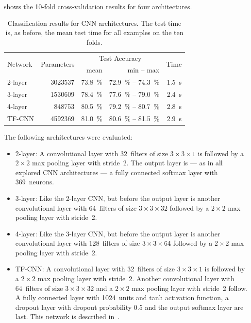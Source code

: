  shows the 10-fold cross-validation results for four
architectures.
\begin{table}[H]
    \centering
    \begin{tabular}{lrrrr}
    \toprule
    \multirow{2}{*}{Network} & \multirow{2}{*}{Parameters}    & \multicolumn{2}{c}{Test Accuracy} & \multirow{2}{*}{Time} \\
            &               & mean                & min -- max\hphantom{00 } & \\\midrule
    2-layer & \num{3023537} & \SI{73.8}{\percent} & \SI{72.9}{\percent} -- \SI{74.3}{\percent} & \SI{1.5}{\second}\\
    3-layer & \num{1530609} & \SI{78.4}{\percent} & \SI{77.6}{\percent} -- \SI{79.0}{\percent} & \SI{2.4}{\second}\\
    4-layer &  \num{848753} & \SI{80.5}{\percent} & \SI{79.2}{\percent} -- \SI{80.7}{\percent} & \SI{2.8}{\second}\\
    TF-CNN  & \num{4592369} & \SI{81.0}{\percent} & \SI{80.6}{\percent} -- \SI{81.5}{\percent} & \SI{2.9}{\second}\\
    \bottomrule
    \end{tabular}
    \caption{Classification results for CNN architectures. The test time is,
             as before, the mean test time for all examples on the ten folds.}
    \label{table:cnn-results}
\end{table}
The following architectures were evaluated:
\begin{itemize}
    \item 2-layer: A convolutional layer with 32~filters of size $3 \times 3 \times 1$
          is followed by a $2 \times 2$ max pooling layer with stride~2. The output
          layer is --- as in all explored CNN architectures --- a fully
          connected softmax layer with 369~neurons.
    \item 3-layer: Like the 2-layer CNN, but before the output layer is another
          convolutional layer with 64~filters of size $3 \times 3 \times 32$
          followed by a $2 \times 2$ max pooling layer with stride~2.
    \item 4-layer: Like the 3-layer CNN, but before the output layer is another
          convolutional layer with 128~filters of size $3 \times 3 \times 64$
          followed by a $2 \times 2$ max pooling layer with stride~2.
    \item TF-CNN: A convolutional layer with 32~filters of size $3 \times 3 \times 1$
          is followed by a $2 \times 2$ max pooling layer with stride~2.
          Another convolutional layer with 64~filters of size $3 \times 3 \times 32$
          and a $2 \times 2$  max pooling layer with stride~2 follow. A fully
          connected layer with 1024~units and tanh activation function, a
          dropout layer with dropout probability 0.5 and the output softmax
          layer are last. This network is described in~\cite{tf-mnist}.
\end{itemize}

